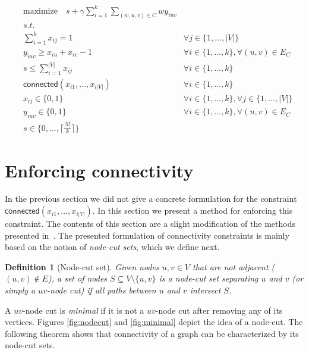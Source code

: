 \documentclass[]{article}
\newtheorem{definition}{Definition}
\begin{document}
\begin{align}
&\text{maximize} \quad s + \gamma \sum_{i=1}^{k} \sum_{(w, u, v) \in C} w y_{iuv} & \\
&\textit{s.t.} & \nonumber \\
& \sum_{i=1}^k x_{ij} = 1 \quad &\forall j \in \{1, \ldots, |V|\} \\
& y_{iuv} \geq x_{iu} + x_{iv} -1 \quad &\forall i \in \{1, \ldots, k\}, \forall (u, v) \in E_{C} \\
&s \leq \sum_{i=1}^{|V|} x_{ij} \quad &\forall i \in \{1, \ldots, k\} \\
& \mathsf{connected}(x_{i1}, \ldots, x_{i|V|}) \quad &\forall i \in \{1, \ldots, k\} \\
& x_{ij} \in \{0, 1\} \quad &\forall i \in \{1, \ldots, k\}, \forall j \in \{1, \ldots, |V|\} \\
& y_{iuv} \in \{0, 1\} \quad &\forall i \in \{1, \ldots, k\}, \forall (u, v) \in E_{C} \\
& s \in \{0, \ldots, \lceil \frac{|V|}{k} \rceil \}
\end{align}

\section{Enforcing connectivity}
\label{sec:connectivity}

In the previous section we did not give a concrete formulation for the constraint $\mathsf{connected}(x_{i1}, \ldots, x_{i|V|})$. In this section we present a method for enforcing this constraint. The contents of this
section are a slight modification of the methods presented in~\citet{CarvajalCGVW13}. The presented formulation of connectivity constraints is mainly based on the notion of \emph{node-cut sets}, which we define next. 

\begin{definition}[Node-cut set]
Given nodes $u, v \in V$ that are not adjacent ($(u, v) \notin E$), a set of nodes $S \subseteq V \setminus \{u, v\}$ is a \emph{node-cut set} separating $u$ and $v$ (or simply a \emph{$uv$-node cut}) if all paths between $u$ and $v$ intersect $S$.
\end{definition}

A $uv$-node cut is \emph{minimal} if it is not a $uv$-node cut after removing any of its vertices. Figures \ref{fig:nodecut} and \ref{fig:minimal} depict the idea of a node-cut. The following theorem shows that connectivity of a graph can be characterized by its node-cut sets. 
\end{document}
